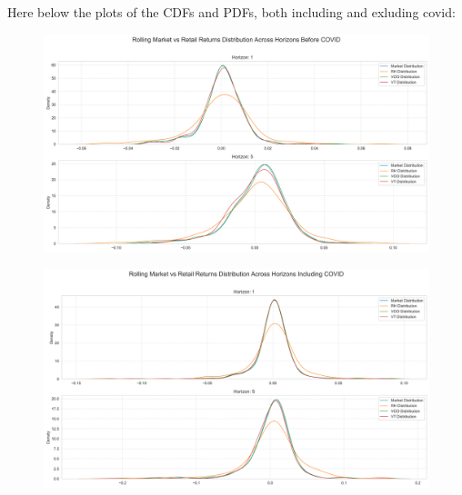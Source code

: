 Here below the plots of the CDFs and PDFs, both including and exluding covid:
\begin{figure}[H]
    \centering
    \includegraphics[width=1\linewidth]{../images/kdes_before_1_5.png}
\end{figure}
\begin{figure}[H]
    \centering
    \includegraphics[width=1\linewidth]{../images/kdes_including_1_5.png}
\end{figure}

